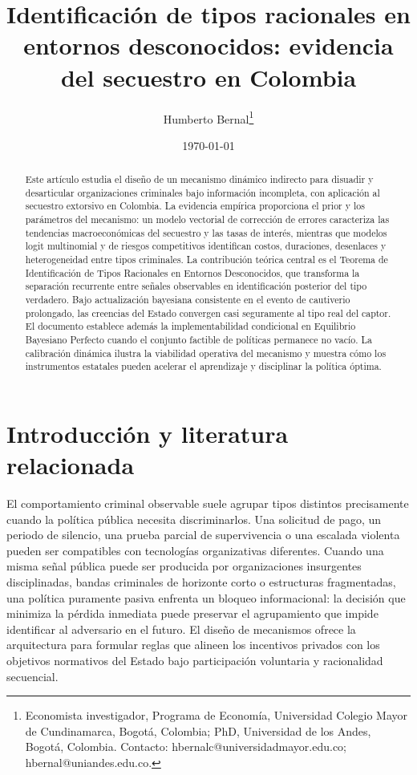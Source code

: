 \documentclass[12pt]{article}
\title{\textbf{Identificación de tipos racionales en entornos desconocidos: evidencia del secuestro en Colombia}}
\author{Humberto Bernal\thanks{Economista investigador, Programa de Economía, Universidad Colegio Mayor de Cundinamarca, Bogotá, Colombia; PhD, Universidad de los Andes, Bogotá, Colombia. Contacto: hbernalc@universidadmayor.edu.co; hbernal@uniandes.edu.co.}}
\date{\today}
\theoremstyle{definition}
\theoremstyle{remark}
\newcommand{\1}{\mathbf{1}}
\begin{document}
\maketitle
\begin{abstract}
Este artículo estudia el diseño de un mecanismo dinámico indirecto para disuadir y desarticular organizaciones criminales bajo información incompleta, con aplicación al secuestro extorsivo en Colombia. La evidencia empírica proporciona el prior y los parámetros del mecanismo: un modelo vectorial de corrección de errores caracteriza las tendencias macroeconómicas del secuestro y las tasas de interés, mientras que modelos logit multinomial y de riesgos competitivos identifican costos, duraciones, desenlaces y heterogeneidad entre tipos criminales. La contribución teórica central es el Teorema de Identificación de Tipos Racionales en Entornos Desconocidos, que transforma la separación recurrente entre señales observables en identificación posterior del tipo verdadero. Bajo actualización bayesiana consistente en el evento de cautiverio prolongado, las creencias del Estado convergen casi seguramente al tipo real del captor. El documento establece además la implementabilidad condicional en Equilibrio Bayesiano Perfecto cuando el conjunto factible de políticas permanece no vacío. La calibración dinámica ilustra la viabilidad operativa del mecanismo y muestra cómo los instrumentos estatales pueden acelerar el aprendizaje y disciplinar la política óptima.
\end{abstract}
\par
{}\par
\vspace{0.75\baselineskip}


\section{Introducción y literatura relacionada}
\label{sec:intro}

El comportamiento criminal observable suele agrupar tipos distintos precisamente cuando la política pública necesita discriminarlos. Una solicitud de pago, un periodo de silencio, una prueba parcial de supervivencia o una escalada violenta pueden ser compatibles con tecnologías organizativas diferentes. Cuando una misma señal pública puede ser producida por organizaciones insurgentes disciplinadas, bandas criminales de horizonte corto o estructuras fragmentadas, una política puramente pasiva enfrenta un bloqueo informacional: la decisión que minimiza la pérdida inmediata puede preservar el agrupamiento que impide identificar al adversario en el futuro. El diseño de mecanismos ofrece la arquitectura para formular reglas que alineen los incentivos privados con los objetivos normativos del Estado bajo participación voluntaria y racionalidad secuencial.
\end{document}
